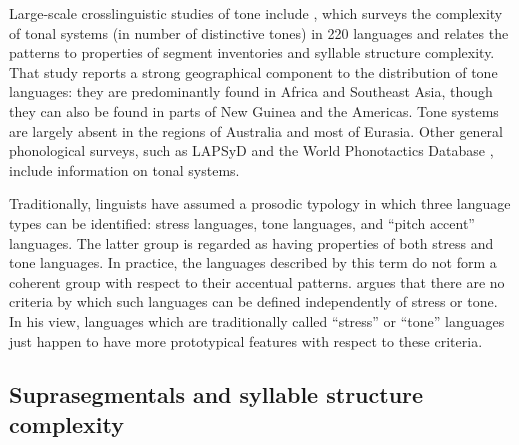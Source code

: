   Large-scale crosslinguistic studies of tone include \citet{Maddieson2013d}, which surveys the complexity of tonal systems (in number of distinctive tones) in 220 languages and relates the patterns to properties of segment inventories and syllable structure complexity. That study reports a strong geographical component to the distribution of tone languages: they are predominantly found in Africa and Southeast Asia, though they can also be found in parts of New Guinea and the Americas. Tone systems are largely absent in the regions of Australia and most of Eurasia. Other general phonological surveys, such as LAPSyD \citep{MaddiesonEtAl2013} and the World Phonotactics Database \citep{DonohueEtAl2013}, include information on tonal systems.

  Traditionally, linguists have assumed a prosodic typology in which three language types can be identified: stress languages, tone languages, and ``pitch accent'' languages. The latter group is regarded as having properties of both stress and tone languages. In practice, the languages described by this term do not form a coherent group with respect to their accentual patterns. \citet{Hyman2009} argues that there are no criteria by which such languages can be defined independently of stress or tone. In his view, languages which are traditionally called ``stress'' or ``tone'' languages just happen to have more prototypical features with respect to these criteria.

\subsection{Suprasegmentals and syllable structure complexity}\label{sec:5.1.2}

